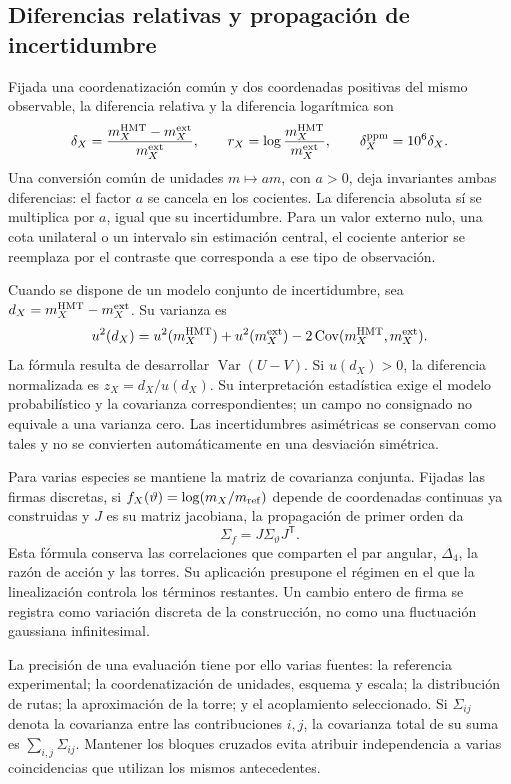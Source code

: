 \subsection{Diferencias relativas y propagación de incertidumbre}
\label{subsec:vi-residuales}

Fijada una coordenatización común y dos coordenadas positivas del mismo observable,
la diferencia relativa y la diferencia logarítmica son
\[
 \delta_X=\frac{m_X^{\rm HMT}-m_X^{\rm ext}}{m_X^{\rm ext}},
 \qquad r_X=\log\frac{m_X^{\rm HMT}}{m_X^{\rm ext}},
 \qquad \delta_X^{\rm ppm}=10^6\delta_X.
\]
Una conversión común de unidades \(m\mapsto am\), con \(a>0\),
deja invariantes ambas diferencias: el factor \(a\) se cancela en los
cocientes. La diferencia absoluta sí se multiplica por \(a\), igual que
su incertidumbre. Para un valor externo nulo, una cota unilateral o un
intervalo sin estimación central, el cociente anterior se reemplaza por
el contraste que corresponda a ese tipo de observación.

Cuando se dispone de un modelo conjunto de incertidumbre, sea
\(d_X=m_X^{\rm HMT}-m_X^{\rm ext}\). Su varianza es
\[
 u^2(d_X)=u^2(m_X^{\rm HMT})+u^2(m_X^{\rm ext})
          -2\operatorname{Cov}(m_X^{\rm HMT},m_X^{\rm ext}).
\]
La fórmula resulta de desarrollar
\(\operatorname{Var}(U-V)\). Si \(u(d_X)>0\), la diferencia
normalizada es \(z_X=d_X/u(d_X)\). Su interpretación estadística exige
el modelo probabilístico y la covarianza correspondientes; un campo no
consignado no equivale a una varianza cero. Las incertidumbres asimétricas
se conservan como tales y no se convierten automáticamente en una desviación
simétrica.

Para varias especies se mantiene la matriz de covarianza conjunta. Fijadas
las firmas discretas, si \(f_X(\vartheta)=\log(m_X/m_{\rm ref})\)
depende de coordenadas continuas ya construidas y \(J\) es su matriz
jacobiana, la propagación de primer orden da
\[
 \Sigma_f=J\Sigma_\vartheta J^{\mathsf T}.
\]
Esta fórmula conserva las correlaciones que comparten el par angular,
\(\Delta_4\), la razón de acción y las torres. Su aplicación presupone
el régimen en el que la linealización controla los términos restantes.
Un cambio entero de firma se registra como variación discreta de la
construcción, no como una fluctuación gaussiana infinitesimal.

La precisión de una evaluación tiene por ello varias fuentes: la
referencia experimental; la coordenatización de unidades, esquema y escala; la
distribución de rutas; la aproximación de la torre; y el acoplamiento
seleccionado. Si \(\Sigma_{ij}\) denota la covarianza entre las
contribuciones \(i,j\), la covarianza total de su suma es
\(\sum_{i,j}\Sigma_{ij}\). Mantener los bloques cruzados evita
atribuir independencia a varias coincidencias que utilizan los mismos
antecedentes.

